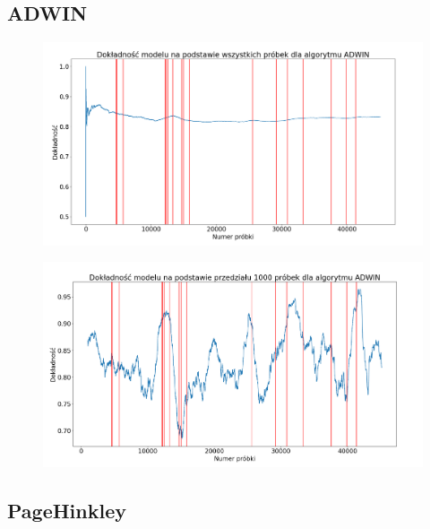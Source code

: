 \documentclass{classrep}
\begin{document}
\subsection{ADWIN}

\begin{figure}[H]
    \centering
    \includegraphics[width=1\textwidth]{resources/stage1/ADWIN.png}
    \label{DDM}
\end{figure}

\begin{figure}[H]
    \centering
    \includegraphics[width=1\textwidth]{resources/stage1/ADWIN_win.png}
    \label{DDMw}
\end{figure}

\subsection{PageHinkley}
\end{document}
